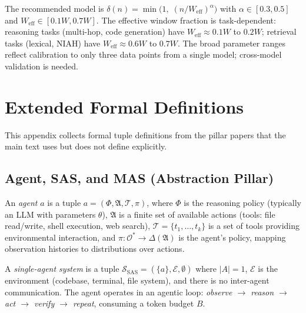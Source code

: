The recommended model is
$\delta(n) = \min\!\bigl(1,\; (n / W_{\text{eff}})^{\alpha}\bigr)$
with $\alpha \in [0.3, 0.5]$ and $W_{\text{eff}} \in [0.1W, 0.7W]$.
The effective window fraction is task-dependent: reasoning tasks
(multi-hop, code generation) have $W_{\text{eff}} \approx 0.1W$ to $0.2W$;
retrieval tasks (lexical, NIAH) have $W_{\text{eff}} \approx 0.6W$ to $0.7W$.
The broad parameter ranges reflect calibration to only three data points
from a single model; cross-model validation is needed.



\section{Extended Formal Definitions}
\label{app:formal-defs}

This appendix collects formal tuple definitions from the pillar papers
that the main text uses but does not define explicitly.

\subsection{Agent, SAS, and MAS (Abstraction Pillar)}

\begin{definition}[Agent]
\label{def:ext-agent}
An \emph{agent} $a$ is a tuple $a = (\Phi, \mathfrak{A}, \mathcal{T}, \pi)$, where
$\Phi$ is the reasoning policy (typically an LLM with parameters $\theta$),
$\mathfrak{A}$ is a finite set of available actions (tools: file read/write, shell execution, web search),
$\mathcal{T} = \{t_1, \ldots, t_k\}$ is a set of tools providing environmental interaction, and
$\pi: \mathcal{O}^* \to \Delta(\mathfrak{A})$ is the agent's policy,
mapping observation histories to distributions over actions.
\end{definition}

\begin{definition}
\label{def:ext-sas}
A \emph{single-agent system} is a tuple
$\mathcal{S}_{\text{SAS}} = (\{a\}, \mathcal{E}, \emptyset)$
where $|A| = 1$, $\mathcal{E}$ is the environment (codebase, terminal, file system),
and there is no inter-agent communication. The agent operates in an agentic loop:
\emph{observe $\to$ reason $\to$ act $\to$ verify $\to$ repeat},
consuming a token budget $B$.
\end{definition}

